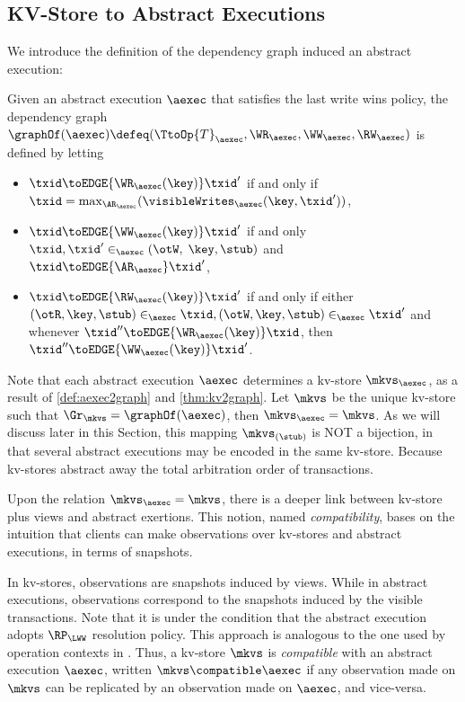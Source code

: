 \subsection{KV-Store to Abstract Executions}
\label{app:aexec2kv}
\label{sec:thm:aexec2kv-compatible-proof}

We introduce the definition of the dependency graph induced an abstract execution:

\begin{definition}
\label{def:aexec2graph}
Given an abstract execution $\aexec$ that satisfies the last write wins policy,
the dependency graph $\graphOf(\aexec) \defeq (\TtoOp{T}_{\aexec}, \WR_{\aexec}, 
\WW_{\aexec}, \RW_{\aexec})$ is defined by letting
\begin{itemize}
\item $\txid \toEDGE{\WR_{\aexec}(\key)} \txid'$ if and only if 
$\txid = \max_{\AR_{\aexec}}(\visibleWrites_{\aexec}(\key, \txid'))$, 
\item $\txid \toEDGE{\WW_{\aexec}(\key)} \txid'$ if and only 
$\txid, \txid' \in_{\aexec} (\otW, \;\key, \stub)$ 
and $\txid \toEDGE{\AR_{\aexec}} \txid'$,
\item $\txid \toEDGE{\RW_{\aexec}(\key)} \txid'$ if and only if either 
$(\otR, \key, \stub) \in_{\aexec} \txid, (\otW, \key, \stub) \in_{\aexec} \txid'$ and 
whenever $\txid'' \toEDGE{\WR_{\aexec}(\key)} \txid$, 
then $\txid'' \toEDGE{\WW_{\aexec}(\key)} \txid'$.
\end{itemize}
\end{definition}

Note that each abstract execution $\aexec$ determines a kv-store $\mkvs_{\aexec}$,
as a result of \cref{def:aexec2graph} and \cref{thm:kv2graph}. 
Let $\mkvs$ be the unique kv-store such that $\Gr_{\mkvs} = \graphOf(\aexec)$, then $\mkvs_{\aexec} = \mkvs$. 
As we will discuss later in this Section,
this mapping $\mkvs_{(\stub)}$ is NOT a bijection, 
in that several abstract executions may be encoded in the same kv-store.
Because kv-stores abstract away the total arbitration order of transactions.

Upon the relation \( \mkvs_{\aexec} = \mkvs \),
there is a deeper link between kv-store plus views and abstract exertions.
This notion, named \emph{compatibility}, bases on the intuition that 
clients can make observations over kv-stores and abstract executions, in terms of snapshots.

In kv-stores, observations are snapshots induced by views. 
While in abstract executions, observations correspond to the snapshots induced by the visible transactions.
Note that it is under the condition that the abstract execution adopts $\RP_{\LWW}$ resolution policy.
This approach is analogous to the one used by operation contexts in \cite{repldatatypes}.
Thus, a kv-store $\mkvs$ is \emph{compatible} with an abstract execution $\aexec$, written \( \mkvs \compatible \aexec \)
if any observation made on $\mkvs$ can be replicated by an observation made on $\aexec$, and vice-versa. 

